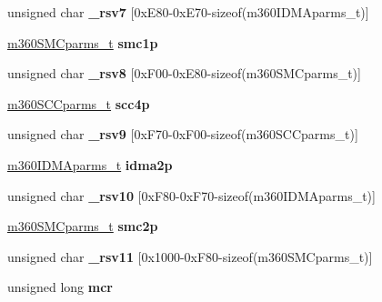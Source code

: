 \begin{DoxyCompactItemize}
unsigned char {\bfseries \+\_\+rsv7} \mbox{[}0x\+E80-\/0x\+E70-\/sizeof(m360\+I\+D\+M\+Aparms\+\_\+t)\mbox{]}
\item 
\mbox{\label{structm360___aaace1707cba65195fe0d87c1e21f5679}} 
\mbox{\hyperlink{structm360SMCparms__}{m360\+S\+M\+Cparms\+\_\+t}} {\bfseries smc1p}
\item 
\mbox{\label{structm360___ab8c38a8498088855eba862a832f2e184}} 
unsigned char {\bfseries \+\_\+rsv8} \mbox{[}0x\+F00-\/0x\+E80-\/sizeof(m360\+S\+M\+Cparms\+\_\+t)\mbox{]}
\item 
\mbox{\label{structm360___af48dadaa817e0cac84915346c8d1215e}} 
\mbox{\hyperlink{structm360SCCparms__}{m360\+S\+C\+Cparms\+\_\+t}} {\bfseries scc4p}
\item 
\mbox{\label{structm360___a8bf6299963a83f832718cfe0cfaf0503}} 
unsigned char {\bfseries \+\_\+rsv9} \mbox{[}0x\+F70-\/0x\+F00-\/sizeof(m360\+S\+C\+Cparms\+\_\+t)\mbox{]}
\item 
\mbox{\label{structm360___aebd0326f617753ecff8684cd9423b39b}} 
\mbox{\hyperlink{structm360IDMAparms__}{m360\+I\+D\+M\+Aparms\+\_\+t}} {\bfseries idma2p}
\item 
\mbox{\label{structm360___aad9189daa83ab4a5099cd46f5f62b832}} 
unsigned char {\bfseries \+\_\+rsv10} \mbox{[}0x\+F80-\/0x\+F70-\/sizeof(m360\+I\+D\+M\+Aparms\+\_\+t)\mbox{]}
\item 
\mbox{\label{structm360___abdac87673dcf2fc2279c72e5c50ea3df}} 
\mbox{\hyperlink{structm360SMCparms__}{m360\+S\+M\+Cparms\+\_\+t}} {\bfseries smc2p}
\item 
\mbox{\label{structm360___a55ae085d1a9d6bd24854c75ad945354e}} 
unsigned char {\bfseries \+\_\+rsv11} \mbox{[}0x1000-\/0x\+F80-\/sizeof(m360\+S\+M\+Cparms\+\_\+t)\mbox{]}
\item 
\mbox{\label{structm360___a93cec5b87e432af2fbcb0d15e3f6d200}} 
unsigned long {\bfseries mcr}
\item 
\mbox{\label{structm360___aa6e3fc56a76eec39ca33afa96f9296d4}} 

\end{DoxyCompactItemize}
